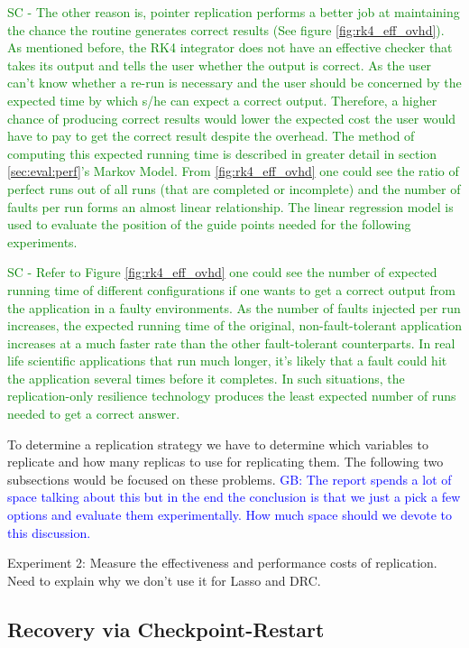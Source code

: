 \documentclass{sig-alternate}
\newcommand{\sui}[1]{%
  \textcolor{green}{SC - #1}
}
\newcommand{\greg}[1]{%
  \textcolor{blue}{GB: #1}
}
\begin{document}
\sui{
The other reason is, pointer replication performs a better job at maintaining the chance the routine generates correct results (See figure \ref{fig:rk4_eff_ovhd}). As mentioned before, the RK4 integrator does not have an effective checker that takes its output and tells the user whether the output is correct. As the user can't know whether a re-run is necessary and the user should be concerned by the expected time by which s/he can expect a correct output. Therefore, a higher chance of producing correct results would lower the expected cost the user would have to pay to get the correct result despite the overhead. The method of computing this expected running time is described in greater detail in section \ref{sec:eval:perf}'s Markov Model. From \ref{fig:rk4_eff_ovhd} one could see the ratio of perfect runs out of all runs (that are completed or incomplete) and the number of faults per run forms an almost linear relationship. The linear regression model is used to evaluate the position of the guide points needed for the following experiments.
} 

\sui{Refer to Figure \ref{fig:rk4_eff_ovhd} one could see the number of expected running time of different configurations if one wants to get a correct output from the application in a faulty environments. As the number of faults injected per run increases, the expected running time of the original, non-fault-tolerant application increases at a much faster rate than the other fault-tolerant counterparts. In real life scientific applications that run much longer, it's likely that a fault could hit the application several times before it completes. In such situations, the replication-only resilience technology produces the least expected number of runs needed to get a correct answer.}

To determine a replication strategy we have to determine which variables to replicate and how many replicas to use for replicating them. The following two subsections would be focused on these problems.
\greg{The report spends a lot of space talking about this but in the end the conclusion is that we just a pick a few options and evaluate them experimentally. How much space should we devote to this discussion.}

Experiment 2: Measure the effectiveness and performance costs of replication. Need to explain why we don't use it for Lasso and DRC.

\subsection{Recovery via Checkpoint-Restart}
\label{sec:res_tech:cr}
\end{document}
